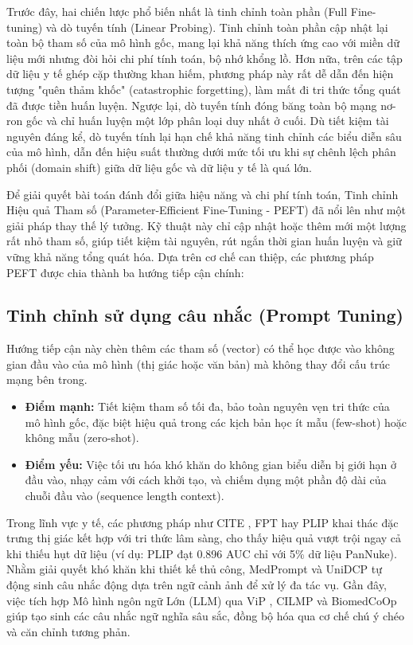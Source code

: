 Trước đây, hai chiến lược phổ biến nhất là tinh chỉnh toàn phần (Full Fine-tuning) và dò tuyến tính (Linear Probing). Tinh chỉnh toàn phần cập nhật lại toàn bộ tham số của mô hình gốc, mang lại khả năng thích ứng cao với miền dữ liệu mới nhưng đòi hỏi chi phí tính toán, bộ nhớ khổng lồ. Hơn nữa, trên các tập dữ liệu y tế ghép cặp thường khan hiếm, phương pháp này rất dễ dẫn đến hiện tượng "quên thảm khốc" (catastrophic forgetting), làm mất đi tri thức tổng quát đã được tiền huấn luyện. Ngược lại, dò tuyến tính đóng băng toàn bộ mạng nơ-ron gốc và chỉ huấn luyện một lớp phân loại duy nhất ở cuối. Dù tiết kiệm tài nguyên đáng kể, dò tuyến tính lại hạn chế khả năng tinh chỉnh các biểu diễn sâu của mô hình, dẫn đến hiệu suất thường dưới mức tối ưu khi sự chênh lệch phân phối (domain shift) giữa dữ liệu gốc và dữ liệu y tế là quá lớn.

Để giải quyết bài toán đánh đổi giữa hiệu năng và chi phí tính toán, Tinh chỉnh Hiệu quả Tham số (Parameter-Efficient Fine-Tuning - PEFT) đã nổi lên như một giải pháp thay thế lý tưởng. Kỹ thuật này chỉ cập nhật hoặc thêm mới một lượng rất nhỏ tham số, giúp tiết kiệm tài nguyên, rút ngắn thời gian huấn luyện và giữ vững khả năng tổng quát hóa. Dựa trên cơ chế can thiệp, các phương pháp PEFT được chia thành ba hướng tiếp cận chính:

\subsection{Tinh chỉnh sử dụng câu nhắc (Prompt Tuning)}
Hướng tiếp cận này chèn thêm các tham số (vector) có thể học được vào không gian đầu vào của mô hình (thị giác hoặc văn bản) mà không thay đổi cấu trúc mạng bên trong.
\begin{itemize}
    \item \textbf{Điểm mạnh:} Tiết kiệm tham số tối đa, bảo toàn nguyên vẹn tri thức của mô hình gốc, đặc biệt hiệu quả trong các kịch bản học ít mẫu (few-shot) hoặc không mẫu (zero-shot).
    \item \textbf{Điểm yếu:} Việc tối ưu hóa khó khăn do không gian biểu diễn bị giới hạn ở đầu vào, nhạy cảm với cách khởi tạo, và chiếm dụng một phần độ dài của chuỗi đầu vào (sequence length context).
\end{itemize}
Trong lĩnh vực y tế, các phương pháp như CITE \cite{CITE}, FPT \cite{FPT} hay PLIP \cite{PLIP} khai thác đặc trưng thị giác kết hợp với tri thức lâm sàng, cho thấy hiệu quả vượt trội ngay cả khi thiếu hụt dữ liệu (ví dụ: PLIP đạt 0.896 AUC chỉ với 5\% dữ liệu PanNuke). Nhằm giải quyết khó khăn khi thiết kế thủ công, MedPrompt \cite{MedPrompt} và UniDCP \cite{UniDCP} tự động sinh câu nhắc động dựa trên ngữ cảnh ảnh để xử lý đa tác vụ. Gần đây, việc tích hợp Mô hình ngôn ngữ Lớn (LLM) qua ViP \cite{ViP}, CILMP \cite{CLIMP} và BiomedCoOp \cite{BiomedCoOp} giúp tạo sinh các câu nhắc ngữ nghĩa sâu sắc, đồng bộ hóa qua cơ chế chú ý chéo và căn chỉnh tương phản.

